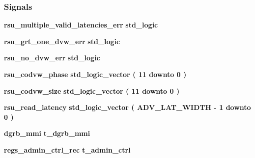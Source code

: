 \subsubsection*{Signals}
 \begin{DoxyCompactItemize}
\item 
{\bf rsu\+\_\+multiple\+\_\+valid\+\_\+latencies\+\_\+err} {\bfseries \textcolor{comment}{std\+\_\+logic}\textcolor{vhdlchar}{ }} 
\item 
{\bf rsu\+\_\+grt\+\_\+one\+\_\+dvw\+\_\+err} {\bfseries \textcolor{comment}{std\+\_\+logic}\textcolor{vhdlchar}{ }} 
\item 
{\bf rsu\+\_\+no\+\_\+dvw\+\_\+err} {\bfseries \textcolor{comment}{std\+\_\+logic}\textcolor{vhdlchar}{ }} 
\item 
{\bf rsu\+\_\+codvw\+\_\+phase} {\bfseries \textcolor{comment}{std\+\_\+logic\+\_\+vector}\textcolor{vhdlchar}{ }\textcolor{vhdlchar}{(}\textcolor{vhdlchar}{ }\textcolor{vhdlchar}{ } \textcolor{vhdldigit}{11} \textcolor{vhdlchar}{ }\textcolor{keywordflow}{downto}\textcolor{vhdlchar}{ }\textcolor{vhdlchar}{ } \textcolor{vhdldigit}{0} \textcolor{vhdlchar}{ }\textcolor{vhdlchar}{)}\textcolor{vhdlchar}{ }} 
\item 
{\bf rsu\+\_\+codvw\+\_\+size} {\bfseries \textcolor{comment}{std\+\_\+logic\+\_\+vector}\textcolor{vhdlchar}{ }\textcolor{vhdlchar}{(}\textcolor{vhdlchar}{ }\textcolor{vhdlchar}{ } \textcolor{vhdldigit}{11} \textcolor{vhdlchar}{ }\textcolor{keywordflow}{downto}\textcolor{vhdlchar}{ }\textcolor{vhdlchar}{ } \textcolor{vhdldigit}{0} \textcolor{vhdlchar}{ }\textcolor{vhdlchar}{)}\textcolor{vhdlchar}{ }} 
\item 
{\bf rsu\+\_\+read\+\_\+latency} {\bfseries \textcolor{comment}{std\+\_\+logic\+\_\+vector}\textcolor{vhdlchar}{ }\textcolor{vhdlchar}{(}\textcolor{vhdlchar}{ }\textcolor{vhdlchar}{ }\textcolor{vhdlchar}{ }\textcolor{vhdlchar}{ }{\bfseries {\bf A\+D\+V\+\_\+\+L\+A\+T\+\_\+\+W\+I\+D\+TH}} \textcolor{vhdlchar}{-\/}\textcolor{vhdlchar}{ } \textcolor{vhdldigit}{1} \textcolor{vhdlchar}{ }\textcolor{keywordflow}{downto}\textcolor{vhdlchar}{ }\textcolor{vhdlchar}{ } \textcolor{vhdldigit}{0} \textcolor{vhdlchar}{ }\textcolor{vhdlchar}{)}\textcolor{vhdlchar}{ }} 
\item 
{\bf dgrb\+\_\+mmi} {\bfseries \textcolor{vhdlchar}{t\+\_\+dgrb\+\_\+mmi}\textcolor{vhdlchar}{ }} 
\item 
{\bf regs\+\_\+admin\+\_\+ctrl\+\_\+rec} {\bfseries \textcolor{vhdlchar}{t\+\_\+admin\+\_\+ctrl}\textcolor{vhdlchar}{ }} 
\item 

\end{DoxyCompactItemize}
